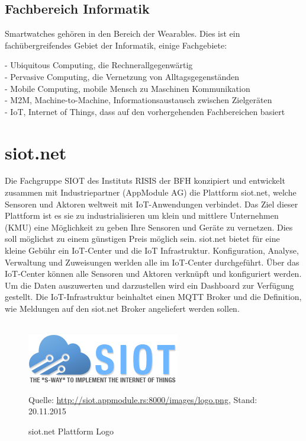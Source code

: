\subsection{Fachbereich Informatik}
Smartwatches gehören in den Bereich der Wearables. Dies ist ein fachübergreifendes Gebiet der Informatik, einige Fachgebiete:

- Ubiquitous Computing, die Rechnerallgegenwärtig \\
- Pervasive Computing, die Vernetzung von Alltagsgegenständen \\
- Mobile Computing, mobile Mensch zu Maschinen Kommunikation \\
- M2M, Machine-to-Machine, Informationsaustausch zwischen Zielgeräten \\
- IoT, Internet of Things, dass auf den vorhergehenden Fachbereichen basiert

\section{siot.net}

Die Fachgruppe SIOT des Instituts RISIS der BFH konzipiert und entwickelt zusammen mit Industriepartner (AppModule AG) die Plattform siot.net, welche Sensoren und Aktoren weltweit mit IoT-Anwendungen verbindet.
Das Ziel dieser Plattform ist es sie zu industrialisieren um klein und mittlere Unternehmen (KMU) eine Möglichkeit zu geben Ihre Sensoren und Geräte zu vernetzen. Dies soll möglichst zu einem günstigen Preis möglich sein.
siot.net bietet für eine kleine Gebühr ein IoT-Center und die IoT Infrastruktur.
Konfiguration, Analyse, Verwaltung und Zuweisungen werlden alle im IoT-Center durchgeführt. Über das IoT-Center können alle Sensoren und Aktoren verknüpft und konfiguriert werden. Um die Daten auszuwerten und darzustellen wird ein Dashboard zur Verfügung gestellt. Die IoT-Infrastruktur beinhaltet einen MQTT Broker und die Definition, wie Meldungen auf den siot.net Broker angeliefert werden sollen.\\\\
\begin{figure}[h]
  \centering
  \includegraphics[scale=1.0]{98_Bilder/02_Grundlagen/siotnetLogo}
  \caption[siot.net Logo]{siot.net Plattform Logo}
  \footnotesize Quelle: \url{http://siot.appmodule.rs:8000/images/logo.png}, Stand: 20.11.2015
\end{figure}
